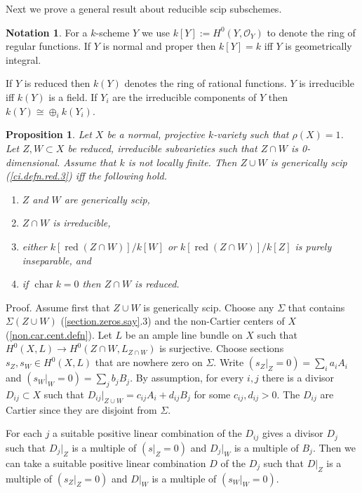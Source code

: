 \documentclass{amsart}
\newtheorem{prop}[thm]{Proposition}
\theoremstyle{definition}
\newtheorem{notation}[thm]{Notation}
\theoremstyle{remark}
\renewcommand{\o}[0]{{\mathcal O}}
\newcommand{\red}[0]{\operatorname{red}}
\newcommand{\chr}[0]{\operatorname{char}}
\begin{document}
Next we prove  a general result about reducible scip subschemes.




\begin{notation}\label{k[X].not} For a $k$-scheme $Y$ we use  
$k[Y]:=H^0(Y, \o_Y)$  to denote the ring of regular functions.
If $Y$ is normal and proper then  $k[Y]=k$ iff $Y$ is geometrically integral.

If $Y$ is reduced  then $k(Y)$  denotes the ring of rational functions.
$Y$ is irreducible iff $k(Y)$ is a field.  If $Y_i$ are the irreducible components of $Y$ then  $k(Y)\cong \oplus_i k(Y_i)$. 
\end{notation}




\begin{prop} \label{Z.cap.W.is.geo.conn}
 Let $X$ be a normal, projective $k$-variety such that  $\rho(X)=1$.
 Let $Z,W\subset X$ be reduced, irreducible subvarieties such  that  $Z\cap W$ is 0-dimensional.  Assume that  $k$ is not locally finite.
Then   $Z\cup W$ is generically scip (\ref{ci.defn.red.3}) iff the following hold.
\begin{enumerate}
\item $Z$ and $W$ are generically scip,
\item $Z\cap W$ is irreducible,
\item either $k[\red(Z\cap W)]/k[W]$ or  $k[\red(Z\cap W)]/k[Z]$ is purely inseparable, and
\item if $\chr k=0$  then    $Z\cap W$ is reduced.
\end{enumerate}
\end{prop}

Proof.  Assume first that $Z\cup W$ is generically scip.
Choose any $\Sigma$ that contains $\Sigma(Z\cup W)$ (\ref{section.zeros.say}.3)
and the non-Cartier centers of $X$ (\ref{non.car.cent.defn}).
Let $L$ be an ample line bundle on $X$ such that
$H^0(X, L)\to H^0(Z\cap W, L_{Z\cap W})$ is surjective. 
Choose  sections $s_Z, s_W\in  H^0(X, L)$ that are nowhere zero on
$\Sigma$.    Write $ (s_Z|_Z=0)=\sum_i a_iA_i$ and 
 $ (s_W|_W=0)=\sum_j b_jB_j$. 
By assumption, for every $i,j$ there is
a divisor $D_{ij}\subset X$ such that 
$D_{ij}| _{Z\cup W}=c_{ij}A_i+d_{ij}B_j$ for some $c_{ij}, d_{ij}>0$. 
The $D_{ij}$ are Cartier since they are disjoint from $\Sigma$. 

For each $j$ a suitable positive linear combination of the $D_{ij}$ gives a divisor $D_j$ such that $D_j|_Z$ is a multiple of  $(s|_Z=0)$ and 
$D_j|_W$ is a multiple of $B_j$. Then we can take a
suitable positive linear combination $D$ of the $D_{j}$
such that $D|_Z$ is a multiple of  $(s_Z|_Z=0)$ and 
$D|_W$ is a multiple of $(s_W|_W=0)$.
 
\end{document}
